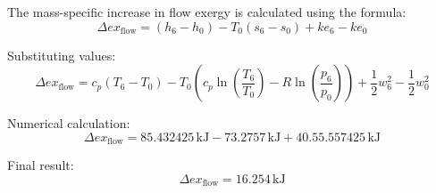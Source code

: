 The mass-specific increase in flow exergy is calculated using the formula:  
\[
\Delta ex_{\text{flow}} = (h_6 - h_0) - T_0 (s_6 - s_0) + ke_6 - ke_0
\]

Substituting values:  
\[
\Delta ex_{\text{flow}} = c_p (T_6 - T_0) - T_0 \left( c_p \ln \left( \frac{T_6}{T_0} \right) - R \ln \left( \frac{p_6}{p_0} \right) \right) + \frac{1}{2} w_6^2 - \frac{1}{2} w_0^2
\]

Numerical calculation:  
\[
\Delta ex_{\text{flow}} = 85.432425 \, \text{kJ} - 73.2757 \, \text{kJ} + 40.55.557425 \, \text{kJ}
\]

Final result:  
\[
\Delta ex_{\text{flow}} = 16.254 \, \text{kJ}
\]